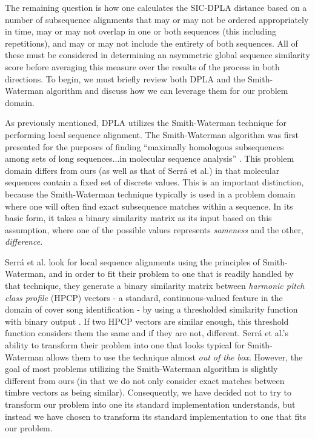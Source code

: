 \documentclass[12pt]{report} 	%
\numberwithin{figure}{chapter}
\numberwithin{table}{chapter}
\numberwithin{equation}{chapter}
\begin{document}
\begin{flushleft}
The remaining question is how one calculates the SIC-DPLA distance based on a number of subsequence alignments that may or may not be ordered appropriately in time, may or may not overlap in one or both sequences (this including repetitions), and may or may not include the entirety of both sequences. All of these must be considered in determining an asymmetric global sequence similarity score before averaging this measure over the results of the process in both directions. To begin, we must briefly review both DPLA and the Smith-Waterman algorithm and discuss how we can leverage them for our problem domain.

As previously mentioned, DPLA utilizes the Smith-Waterman technique for performing local sequence alignment. The Smith-Waterman algorithm was first presented for the purposes of  finding ``maximally homologous subsequences among sets of long sequences...in molecular sequence analysis''  \cite[p. 196]{smith1981textordfeminineidentification}. This problem domain differs from ours (as well as that of Serr\'a et al.) in that molecular sequences contain a fixed set of discrete values. This is an important distinction, because the Smith-Waterman technique typically is used in a problem domain where one will often find exact subsequence matches within a sequence. In its basic form, it takes a binary similarity matrix as its input based on this assumption, where one of the possible values represents \textit{sameness} and the other, \textit{difference}.

Serr\'a et al. look for local sequence alignments using the principles of Smith-Waterman, and in order to fit their problem to one that is readily handled by that technique, they generate a binary similarity matrix between \textit{harmonic pitch class profile} (HPCP) vectors - a standard, continuous-valued feature in the domain of cover song identification - by using a thresholded similarity function with binary output \cite{serra2008chroma}. If two HPCP vectors are similar enough, this threshold function considers them the same and if they are not, different. Serr\'a et al.'s ability to transform their problem into one that looks typical for Smith-Waterman allows them to use the technique almost \textit{out of the box}.  However, the goal of most problems utilizing the Smith-Waterman algorithm is slightly different from ours (in that we do not only consider exact matches between timbre vectors as being similar). Consequently, we have decided not to try to transform our problem into one its standard implementation understands, but instead we have chosen to transform its standard implementation to one that fits our problem.


\end{flushleft}
\end{document}
